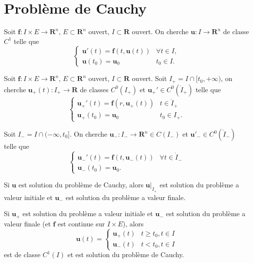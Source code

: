 
\section{Problème de Cauchy}
\begin{problem}[De Cauchy]
Soit $\boldsymbol{f}:I\times E\to \mathbf{R}^{n}$, $E\subset \mathbf{R}^{n}$ ouvert, $I\subset \mathbf{R}$ ouvert. On cherche $\boldsymbol{u}:I\to \mathbf{R}^{n}$ de classe $C^{1}$ telle que 
$$
\begin{cases}
\boldsymbol{u}'(t)=\boldsymbol{f}(t,\boldsymbol{u}(t)) &  \forall t\in I, \\
\boldsymbol{u}(t_{0})=\boldsymbol{u}_{0} & t_{0}\in I.
\end{cases}
$$
\end{problem}
\begin{problem}
Soit $\boldsymbol{f}:I\times E\to \mathbf{R}^{n}$, $E\subset \mathbf{R}^{n}$ ouvert, $I\subset \mathbf{R}$ ouvert. Soit $I_{+}=I\cap[t_{0},+\infty)$, on cherche $\boldsymbol{u}_{+}(t):I_{+}\to \mathbf{R}$ de classes $C^{0}(I_{+})$ et $\boldsymbol{u}_{+}'\in C^{0}(\mathring{ I }_{+})$ telle que
$$
\begin{cases}
\boldsymbol{u}_{+}'(t)=\boldsymbol{f}(r,\boldsymbol{u}_{+}(t)) & t\in \mathring{ I }_{+} \\
\boldsymbol{u}_{+}(t_{0})=\boldsymbol{u}_{0} & t_{0}\in I_{+}.
\end{cases}
$$
\end{problem}
\begin{problem}
Soit $I_{-}=I\cap (-\infty,t_{0}]$. On cherche $\boldsymbol{u}_{-}:I_{-}\to \mathbf{R}^{n}\in C(I_{-})$ et $\boldsymbol{u}'_{-}\in C^{0}(\mathring{ I }_{-})$ telle que
$$
\begin{cases}
\boldsymbol{u}_{-}'(t)=\boldsymbol{f}(t,\boldsymbol{u}_{-}(t)) & \forall t\in \mathring{ I }_{-} \\
\boldsymbol{u}_{-}(t_{0})=\boldsymbol{u}_{0}.
\end{cases}
$$
\end{problem}
\begin{remark}
Si $\boldsymbol{u}$ est solution du problème de Cauchy, alors $\boldsymbol{u}|_{I_{+}}$ est solution du problème a valeur initiale et $\boldsymbol{u}_{-}$ est solution du problème a valeur finale.

Si $\boldsymbol{u}_{+}$ est solution du problème a valeur initiale et $\boldsymbol{u}_{-}$ est solution du problème a valeur finale (et $\boldsymbol{f}$ est continue sur $I\times E$), alors 
$$
\boldsymbol{u}(t)=\begin{cases}
\boldsymbol{u}_{+}(t) & t \ge t_{0}, t\in I \\
\boldsymbol{u}_{-}(t) & t <t_{0} ,t\in I
\end{cases}
$$
est de classe $C^{1}(I)$ et est solution du problème de Cauchy.
\end{remark}
